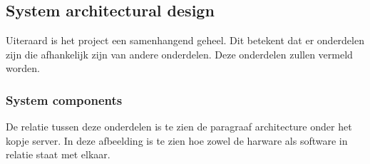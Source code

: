     \newpage
\subsection{System architectural design}
Uiteraard is het project een samenhangend geheel. Dit betekent dat er onderdelen zijn die afhankelijk zijn van andere onderdelen. Deze onderdelen zullen vermeld worden.

\subsubsection*{System components}
De relatie tussen deze onderdelen is te zien de paragraaf architecture onder het kopje server. In deze afbeelding is te zien hoe zowel de harware als software in relatie staat met elkaar.
